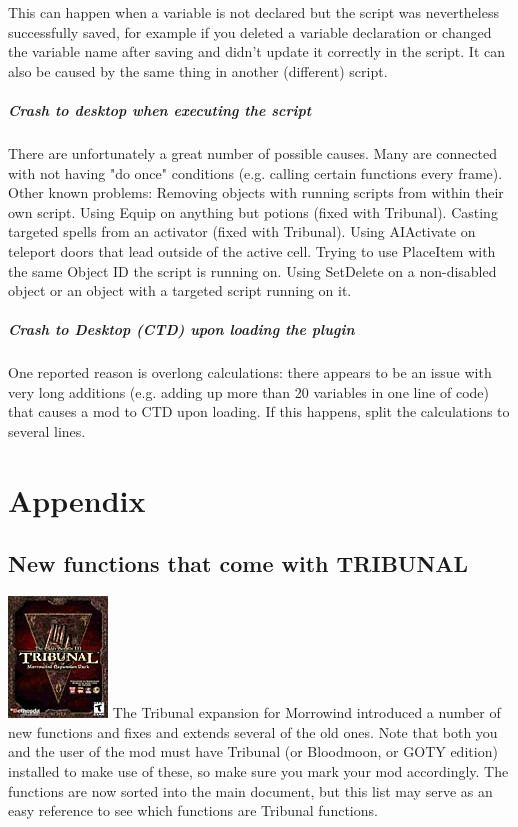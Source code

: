 \documentclass[
]{article}
\begin{document}
This can happen when a variable is not declared but the script was
nevertheless successfully saved, for example if you deleted a variable
declaration or changed the variable name after saving and didn't update
it correctly in the script. It can also be caused by the same thing in
another (different) script.

\hypertarget{crash-to-desktop-when-executing-the-script}{%
\subparagraph{Crash to desktop when executing the
script}\label{crash-to-desktop-when-executing-the-script}}

There are unfortunately a great number of possible causes. Many are
connected with not having "do once" conditions (e.g. calling certain
functions every frame). Other known problems: Removing objects with
running scripts from within their own script. Using Equip on anything
but potions (fixed with Tribunal). Casting targeted spells from an
activator (fixed with Tribunal). Using AIActivate on teleport doors that
lead outside of the active cell. Trying to use PlaceItem with the same
Object ID the script is running on. Using SetDelete on a non-disabled
object or an object with a targeted script running on it.

\hypertarget{crash-to-desktop-ctd-upon-loading-the-plugin}{%
\subparagraph{\texorpdfstring{Crash to Desktop (CTD) upon loading the
plugin
}{Crash to Desktop (CTD) upon loading the plugin }}\label{crash-to-desktop-ctd-upon-loading-the-plugin}}

One reported reason is overlong calculations: there appears to be an
issue with very long additions (e.g. adding up more than 20 variables in
one line of code) that causes a mod to CTD upon loading. If this
happens, split the calculations to several lines.

\hypertarget{appendix}{%
\section{Appendix}\label{appendix}}

\hypertarget{new-functions-that-come-with-tribunal}{%
\subsection{New functions that come with
TRIBUNAL}\label{new-functions-that-come-with-tribunal}}

\includegraphics{media/image6.png} The Tribunal expansion for Morrowind
introduced a number of new functions and fixes and extends several of
the old ones. Note that both you and the user of the mod must have
Tribunal (or Bloodmoon, or GOTY edition) installed to make use of these,
so make sure you mark your mod accordingly. The functions are now sorted
into the main document, but this list may serve as an easy reference to
see which functions are Tribunal functions.
\end{document}
